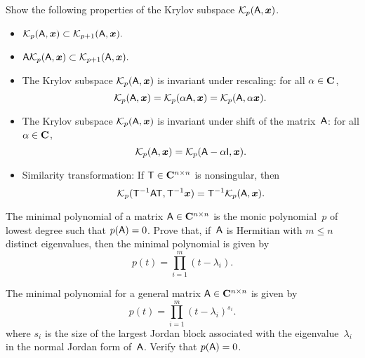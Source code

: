 \begin{exercise}
    \label{exercise:krylov}
    Show the following properties of the Krylov subspace $\mathcal K_p(\mathsf A, \mathbf{\boldsymbol{x}})$.
    \begin{itemize}
        \item
            \(
                \mathcal K_p(\mathsf A, \mathbf{\boldsymbol{x}}) \subset \mathcal K_{p+1}(\mathsf A, \mathbf{\boldsymbol{x}}).
            \)

        \item
            \(
                \mathsf A \mathcal K_p(\mathsf A, \mathbf{\boldsymbol{x}}) \subset \mathcal K_{p+1}(\mathsf A, \mathbf{\boldsymbol{x}}).
            \)

        \item
            The Krylov subspace $\mathcal K_p(\mathsf A, \mathbf{\boldsymbol{x}})$ is invariant under rescaling:
            for all $\alpha \in \mathbf C$,
            \[
                \mathcal K_p(\mathsf A, \mathbf{\boldsymbol{x}}) = \mathcal K_p(\alpha \mathsf A, \mathbf{\boldsymbol{x}}) = \mathcal K_p(\mathsf A, \alpha \mathbf{\boldsymbol{x}}).
            \]

        \item
            The Krylov subspace $\mathcal K_p(\mathsf A, \mathbf{\boldsymbol{x}})$ is invariant under shift of the matrix~$\mathsf A$:
            for all $\alpha \in \mathbf C$,
            \[
                \mathcal K_p(\mathsf A, \mathbf{\boldsymbol{x}}) = \mathcal K_p(\mathsf A - \alpha \mathsf I, \mathbf{\boldsymbol{x}}).
            \]

        \item
            Similarity transformation: If $\mathsf T \in \mathbf C^{n \times n}$ is nonsingular,
            then
            \[
                \mathcal K_p(\mathsf T^{-1} \mathsf A \mathsf T, \mathsf T^{-1} \mathbf{\boldsymbol{x}}) =
                \mathsf T^{-1} \mathcal K_p(\mathsf A, \mathbf{\boldsymbol{x}}).
            \]
    \end{itemize}
\end{exercise}

\begin{exercise}
    The minimal polynomial of a matrix $\mathsf A \in \mathbf C^{n \times n}$ is the monic polynomial~$p$ of lowest degree such that $p(\mathsf A) = 0$.
    Prove that, if~$\mathsf A$ is Hermitian with $m \leq n$ distinct eigenvalues,
    then the minimal polynomial is given by
    \[
        p(t) = \prod_{i=1}^m (t - \lambda_i).
    \]
\end{exercise}

\begin{exercise}
    The minimal polynomial for a general matrix $\mathsf A \in \mathbf C^{n \times n}$ is given by
    \[
        p(t) = \prod_{i=1}^m (t - \lambda_i)^{s_i}.
    \]
    where $s_i$ is the size of the largest Jordan block associated with the eigenvalue~$\lambda_i$ in the normal Jordan form of~$\mathsf A$.
    Verify that $p(\mathsf A) = 0$.
\end{exercise}

